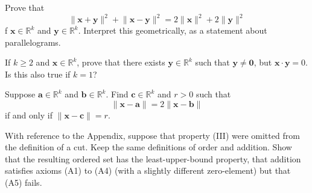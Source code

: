 \documentclass[12 pt, letterpaper]{hmcpset}
\begin{document}
\pagebreak

\begin{problem}[17.]
	Prove that
	\[
		\lVert \mathbf{x} + \mathbf{y} \rVert^{2} + \lVert \mathbf{x} - \mathbf{y} \rVert^{2} = 2 \lVert \mathbf{x} \rVert^{2} + 2 \lVert \mathbf{y} \rVert^{2}
	\]
	f $\mathbf{x} \in \mathbb{R}^{k}$ and $\mathbf{y} \in \mathbb{R}^{k}$. Interpret this geometrically, as a statement about parallelograms.
\end{problem}

\pagebreak

\begin{problem}[18.]
	If $k \ge 2$ and $\mathbf{x} \in \mathbb{R}^{k}$, prove that there exists $\mathbf{y} \in \mathbb{R}^{k}$ such that $\mathbf{y} \neq \mathbf{0}$, but $\mathbf{x} \cdot \mathbf{y} = 0$. Is this also true if $k = 1$?
\end{problem}

\pagebreak

\begin{problem}[19.]
	Suppose $\mathbf{a} \in \mathbb{R}^{k}$ and $\mathbf{b} \in \mathbb{R}^{k}$. Find $\mathbf{c} \in \mathbb{R}^{k}$ and $r > 0$ such that
	 \[
		\lVert \mathbf{x} - \mathbf{a} \rVert = 2 \lVert \mathbf{x} - \mathbf{b} \rVert
	\]
	if and only if $\lVert \mathbf{x} - \mathbf{c} \rVert = r$.
\end{problem}

\pagebreak

\begin{problem}[20.]
	With reference to the Appendix, suppose that property (III) were omitted from the definition of a cut. Keep the same definitions of order and addition. Show that the resulting ordered set has the least-upper-bound property, that addition satisfies axioms (A1) to (A4) (with a slightly different zero-element) but that (A5) fails.
\end{problem}
\end{document}

